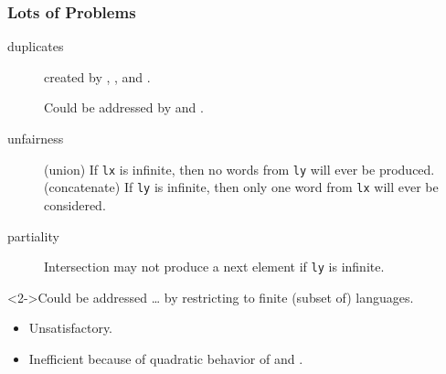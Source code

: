\documentclass[pdftex]{beamer}
\begin{document}
\begin{frame}
  \frametitle{Lots of Problems}
  \begin{description}
  \item[duplicates] created by , , and .

    Could be addressed by  and .
  \item[unfairness] (union) If \texttt{lx} is infinite, then no words
    from \texttt{ly} will ever be produced.
    (concatenate) If \texttt{ly} is infinite, then only one word
    from \texttt{lx} will ever be considered.
  \item[partiality] Intersection may not produce a next element if \texttt{ly} is infinite.
  \end{description}
  \begin{block}<2->{Could be addressed \dots} by restricting to finite
    (subset of) languages.
    \begin{itemize}
    \item Unsatisfactory.
    \item Inefficient because of
    quadratic behavior of  and .
  \end{itemize}
  \end{block}
\end{frame}
\end{document}
